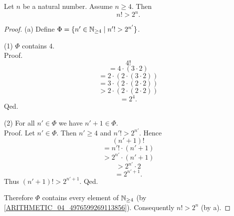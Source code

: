 \documentclass[10pt]{article}
\begin{document}
  \begin{forthel}
    \begin{proposition}
      Let $n$ be a natural number.
      Assume $n \geq 4$.
      Then \[ n! > 2^{n}. \]
    \end{proposition}
    \begin{proof}
      (a) Define $\Phi = \{ n' \in \mathbb{N}_{\geq 4} \mid n'! > 2^{n'} \}$.
  
      (1) $\Phi$ contains $4$. \\
      Proof.
        \[  4!                                  \]
        \[    = 4 \cdot (3 \cdot 2)             \]
        \[    = 2 \cdot (2 \cdot (3 \cdot 2))   \]
        \[    = 3 \cdot (2 \cdot (2 \cdot 2))   \]
        \[    > 2 \cdot (2 \cdot (2 \cdot 2))   \]
        \[    = 2^{4}.                          \]
      Qed.
  
      (2) For all $n' \in \Phi$ we have $n' + 1 \in \Phi$. \\
      Proof.
        Let $n' \in \Phi$.
        Then $n' \geq 4$ and $n'! > 2^{n'}$.
        Hence
        \[  (n' + 1)!                   \]
        \[    = n'! \cdot (n' + 1)      \]
        \[    > 2^{n'} \cdot (n' + 1)   \]
        \[    > 2^{n'} \cdot 2          \]
        \[    = 2^{n' + 1}.             \]
        Thus $(n' + 1)! > 2^{n' + 1}$.
      Qed.
  
      Therefore $\Phi$ contains every element of $\mathbb{N}_{\geq 4}$ (by \cref{ARITHMETIC_04_4976599269113856}).
      Consequently $n! > 2^{n}$ (by a).
    \end{proof}
  \end{forthel}
\end{document}

